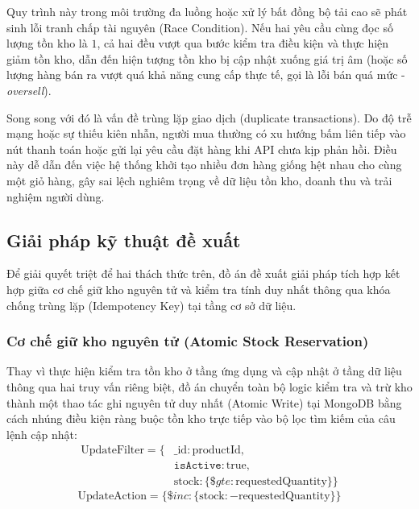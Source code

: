 \documentclass[../DoAn.tex]{subfiles}
\begin{document}
Quy trình này trong môi trường đa luồng hoặc xử lý bất đồng bộ tải cao sẽ phát sinh lỗi tranh chấp tài nguyên (Race Condition). Nếu hai yêu cầu cùng đọc số lượng tồn kho là $1$, cả hai đều vượt qua bước kiểm tra điều kiện và thực hiện giảm tồn kho, dẫn đến hiện tượng tồn kho bị cập nhật xuống giá trị âm (hoặc số lượng hàng bán ra vượt quá khả năng cung cấp thực tế, gọi là lỗi bán quá mức - \textit{oversell}).

Song song với đó là vấn đề trùng lặp giao dịch (duplicate transactions). Do độ trễ mạng hoặc sự thiếu kiên nhẫn, người mua thường có xu hướng bấm liên tiếp vào nút thanh toán hoặc gửi lại yêu cầu đặt hàng khi API chưa kịp phản hồi. Điều này dễ dẫn đến việc hệ thống khởi tạo nhiều đơn hàng giống hệt nhau cho cùng một giỏ hàng, gây sai lệch nghiêm trọng về dữ liệu tồn kho, doanh thu và trải nghiệm người dùng.

\subsection{Giải pháp kỹ thuật đề xuất}
Để giải quyết triệt để hai thách thức trên, đồ án đề xuất giải pháp tích hợp kết hợp giữa cơ chế giữ kho nguyên tử và kiểm tra tính duy nhất thông qua khóa chống trùng lặp (Idempotency Key) tại tầng cơ sở dữ liệu.

\subsubsection{Cơ chế giữ kho nguyên tử (Atomic Stock Reservation)}
Thay vì thực hiện kiểm tra tồn kho ở tầng ứng dụng và cập nhật ở tầng dữ liệu thông qua hai truy vấn riêng biệt, đồ án chuyển toàn bộ logic kiểm tra và trừ kho thành một thao tác ghi nguyên tử duy nhất (Atomic Write) tại MongoDB bằng cách nhúng điều kiện ràng buộc tồn kho trực tiếp vào bộ lọc tìm kiếm của câu lệnh cập nhật:
\begin{equation}
    \begin{aligned}
        \text{UpdateFilter} = \{ & \text{\_id}: \text{productId}, \\
        & \texttt{isActive}: \text{true}, \\
        & \text{stock}: \{ \$gte: \text{requestedQuantity} \} \}
    \end{aligned}
\end{equation}
\begin{equation}
    \text{UpdateAction} = \{ \$inc: \{ \text{stock}: -\text{requestedQuantity} \} \}
\end{equation}
\end{document}
